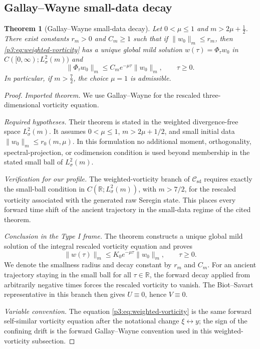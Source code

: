\documentclass[11pt]{amsart}
\theoremstyle{plain}
\newtheorem{theorem}{Theorem}[section]
\theoremstyle{definition}
\theoremstyle{remark}
\numberwithin{equation}{section}
\newcommand{\calC}{\mathcal C}
\begin{document}
\subsection{Gallay--Wayne small-data decay}

\begin{theorem}[Gallay--Wayne small-data decay]\label{p3:thm:gallay}
Let \(0<\mu\le1\) and \(m>2\mu+\frac12\).  There exist constants
\(r_m>0\) and \(C_m\ge1\) such that if \(\|w_0\|_m\le r_m\), then
\eqref{p3:eq:weighted-vorticity} has a unique global mild solution
\(w(\tau)=\Phi_\tau w_0\) in \(C([0,\infty);L^2_\sigma(m))\) and
\[
   \|\Phi_\tau w_0\|_m
   \le
   C_m e^{-\mu\tau}\|w_0\|_m,\qquad \tau\ge0.
\]
In particular, if \(m>\frac72\), the choice \(\mu=1\) is admissible.
\end{theorem}

\begin{proof}
\smallskip
\noindent\emph{Imported theorem.}
We use Gallay--Wayne \cite[Theorem 2.3]{GallayWayne2002} for the rescaled
three-dimensional vorticity equation.

\smallskip
\noindent\emph{Required hypotheses.}
Their theorem is stated in the weighted divergence-free space
\(L^2_\sigma(m)\).  It assumes \(0<\mu\le1\), \(m>2\mu+1/2\), and small initial
data \(\|w_0\|_m\le r_0(m,\mu)\).  In this formulation no additional moment,
orthogonality, spectral-projection, or codimension condition is used beyond
membership in the stated small ball of \(L^2_\sigma(m)\).

\smallskip
\noindent\emph{Verification for our profile.}
The weighted-vorticity branch of \(\calC_{\mathrm{sd}}\) requires exactly the
small-ball condition in \(C(\mathbb R;L^2_\sigma(m))\), with \(m>7/2\), for
the rescaled vorticity associated with the generated raw Seregin state.  This
places every forward time shift of the ancient trajectory in
the small-data regime of the cited theorem.

\smallskip
\noindent\emph{Conclusion in the Type I frame.}
The theorem constructs a unique global mild solution of the integral rescaled
vorticity equation and proves
\[
   \|w(\tau)\|_m\le K_0e^{-\mu\tau}\|w_0\|_m,\qquad \tau\ge0.
\]
We denote the smallness radius and decay constant by \(r_m\) and \(C_m\).
For an ancient trajectory staying in the small ball for all
\(\tau\in\mathbb R\), the forward decay applied from arbitrarily negative
times forces the rescaled vorticity to vanish.  The Biot--Savart
representative in this branch then gives \(U\equiv0\), hence \(V\equiv0\).

\smallskip
\noindent\emph{Variable convention.}
The equation \eqref{p3:eq:weighted-vorticity} is the same forward
self-similar vorticity equation after the notational change
\(\xi\leftrightarrow y\); the sign of the confining drift is the forward
Gallay--Wayne convention used in this weighted-vorticity subsection.
\end{proof}
\end{document}
